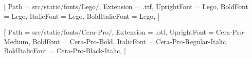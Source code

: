 
\contourlength{0.8pt}

\renewcommand{\ULdepth}{3.8pt}


\contourlength{0.8pt}

\renewcommand{\ULdepth}{3.8pt}

[
Path = src/static/fonts/Lego/,
Extension = .ttf,
UprightFont = Lego,
BoldFont = Lego,
ItalicFont = Lego,
BoldItalicFont = Lego,
]

\setmainfont{Cera-Pro-Medium}[
Path = src/static/fonts/Cera-Pro/,
Extension = .otf,
UprightFont = Cera-Pro-Medium,
BoldFont = Cera-Pro-Bold,
ItalicFont = Cera-Pro-Regular-Italic,
BoldItalicFont = Cera-Pro-Black-Italic,
]